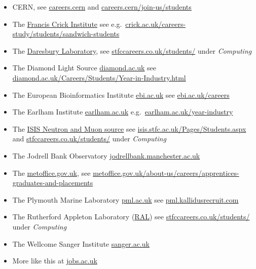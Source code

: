 \documentclass[
]{book}
\providecommand{\tightlist}{%
  \setlength{\itemsep}{0pt}\setlength{\parskip}{0pt}}
\begin{document}
\begin{itemize}
\tightlist
\item
  CERN, see \href{https://careers.cern/}{careers.cern} and \href{https://careers.cern/join-us/students}{careers.cern/join-us/students}
\item
  The \href{https://en.wikipedia.org/wiki/Francis_Crick_Institute}{Francis Crick Institute} see e.g.~\href{https://www.crick.ac.uk/careers-study/students/sandwich-students}{crick.ac.uk/careers-study/students/sandwich-students}
\item
  The \href{https://en.wikipedia.org/wiki/Daresbury_Laboratory}{Daresbury Laboratory}, see \href{https://stfccareers.co.uk/students/}{stfccareers.co.uk/students/} under \emph{Computing}
\item
  The Diamond Light Source \href{https://www.diamond.ac.uk/}{diamond.ac.uk} see \href{https://www.diamond.ac.uk/Careers/Students/Year-in-Industry.html}{diamond.ac.uk/Careers/Students/Year-in-Industry.html}
\item
  The European Bioinformatics Institute \href{https://www.ebi.ac.uk/}{ebi.ac.uk} see \href{https://www.ebi.ac.uk/careers}{ebi.ac.uk/careers}
\item
  The Earlham Institute \href{https://www.earlham.ac.uk/}{earlham.ac.uk} e.g.~\href{https://www.earlham.ac.uk/year-industry}{earlham.ac.uk/year-industry}
\item
  The \href{https://en.wikipedia.org/wiki/ISIS_Neutron_and_Muon_Source}{ISIS Neutron and Muon source} see \href{https://www.isis.stfc.ac.uk/Pages/Students.aspx}{isis.stfc.ac.uk/Pages/Students.aspx} and \href{https://stfccareers.co.uk/students/}{stfccareers.co.uk/students/} under \emph{Computing}
\item
  The Jodrell Bank Observatory \href{https://www.jodrellbank.manchester.ac.uk/}{jodrellbank.manchester.ac.uk}
\item
  The \href{https://www.metoffice.gov.uk/}{metoffice.gov.uk}, see \href{https://www.metoffice.gov.uk/about-us/careers/apprentices-graduates-and-placements}{metoffice.gov.uk/about-us/careers/apprentices-graduates-and-placements}
\item
  The Plymouth Marine Laboratory \href{https://www.pml.ac.uk/}{pml.ac.uk} see \href{https://pml.kallidusrecruit.com/}{pml.kallidusrecruit.com}
\item
  The Rutherford Appleton Laboratory (\href{https://en.wikipedia.org/wiki/Rutherford_Appleton_Laboratory}{RAL}) see \href{https://stfccareers.co.uk/students/}{stfccareers.co.uk/students/} under \emph{Computing}
\item
  The Wellcome Sanger Institute \href{https://www.sanger.ac.uk/}{sanger.ac.uk}
\item
  More like this at \href{https://jobs.ac.uk/}{jobs.ac.uk}
\end{itemize}
\end{document}
